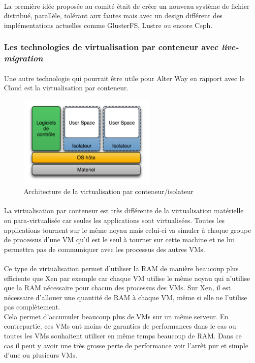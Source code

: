 \paragraph*{}
La première idée proposée au comité était de créer un nouveau système de fichier distribué, parallèle, tolérant aux fautes mais avec un design différent des implémentations actuelles
comme GlusterFS, Lustre ou encore Ceph.


\subsubsection{Les technologies de virtualisation par conteneur avec \emph{live-migration}}
\paragraph*{}
Une autre technologie qui pourrait être utile pour Alter Way en rapport avec le Cloud est la virtualisation par conteneur.

\begin{figure}[H]
\centering
\includegraphics[width=0.6\textwidth]{resource/img/Diagramme_ArchiIsolateur}
\caption{Architecture de la virtualisation par conteneur/isolateur}
\end{figure}

\paragraph*{}
La virtualisation par conteneur est très différente de la virtualisation matérielle ou para-virtualisée car seules les applications sont virtualisées.
Toutes les applications tournent sur le même noyau mais celui-ci va simuler à chaque groupe de processus d'une VM qu'il est le seul à tourner sur
cette machine et ne lui permettra pas de communiquer avec les processus des autres VMs.

\paragraph*{}
Ce type de virtualisation permet d'utiliser la RAM de manière beaucoup plus efficiente que Xen par exemple car chaque VM utilise le même noyau qui n'utilise
que la RAM nécessaire pour chacun des processus des VMs. Sur Xen, il est nécessaire d'allouer une quantité de RAM à chaque VM, même si elle ne l'utilise pas complètement.
\\
Cela permet d'accumuler beaucoup plus de VMs sur un même serveur. En contrepartie, ces VMs ont moins de garanties de performances dans le cas ou toutes les VMs souhaitent utiliser
en même temps beaucoup de RAM. Dans ce cas il peut y avoir une très grosse perte de performance voir l'arrêt pur et simple d'une ou plusieurs VMs.

